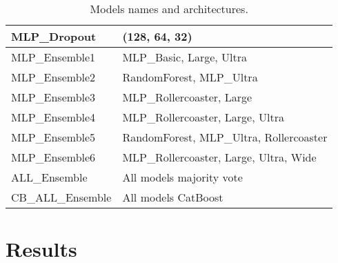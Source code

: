 \documentclass[twocolumn]{class}
\begin{document}
\begin{table}[h!]
\begin{tabular}{|l|l|}
        MLP\_Dropout            & (128, 64, 32)                                         \\ \hline
        MLP\_Ensemble1          & MLP\_Basic, Large, Ultra                    \\ \hline
        MLP\_Ensemble2          & RandomForest, MLP\_Ultra                              \\ \hline
        MLP\_Ensemble3          & MLP\_Rollercoaster, Large                        \\ \hline
        MLP\_Ensemble4          & MLP\_Rollercoaster, Large, Ultra            \\ \hline
        MLP\_Ensemble5          & RandomForest, MLP\_Ultra, Rollercoaster          \\ \hline
        MLP\_Ensemble6          & MLP\_Rollercoaster, Large, Ultra, Wide \\ \hline
        ALL\_Ensemble           & All models majority vote                              \\ \hline
        CB\_ALL\_Ensemble       & All models CatBoost                                   \\ \hline
    \end{tabular}
    \caption{Models names and architectures.}
    \label{tab:models}
\end{table}





\section{Results}







\clearpage


\clearpage
\printbibliography
\end{document}
